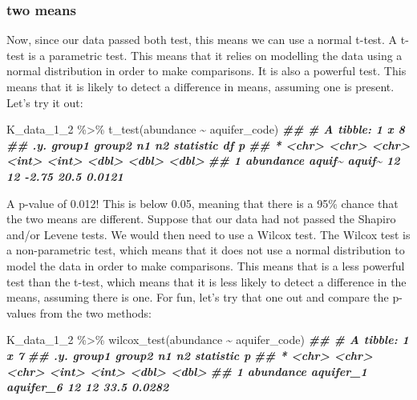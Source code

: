 \documentclass[
]{krantz}
\newenvironment{Shaded}{\begin{snugshade}}{\end{snugshade}}
\newcommand{\DocumentationTok}[1]{\textcolor[rgb]{0.56,0.35,0.01}{\textbf{\textit{#1}}}}
\newcommand{\FunctionTok}[1]{\textcolor[rgb]{0.00,0.00,0.00}{#1}}
\newcommand{\NormalTok}[1]{#1}
\newcommand{\SpecialCharTok}[1]{\textcolor[rgb]{0.00,0.00,0.00}{#1}}
\begin{document}
\hypertarget{two-means}{%
\subsubsection{two means}\label{two-means}}

Now, since our data passed both test, this means we can use a normal t-test. A t-test is a parametric test. This means that it relies on modelling the data using a normal distribution in order to make comparisons. It is also a powerful test. This means that it is likely to detect a difference in means, assuming one is present. Let's try it out:

\begin{Shaded}
\begin{Highlighting}[]
\NormalTok{K\_data\_1\_2 }\SpecialCharTok{\%\textgreater{}\%}
  \FunctionTok{t\_test}\NormalTok{(abundance }\SpecialCharTok{\textasciitilde{}}\NormalTok{ aquifer\_code)}
\DocumentationTok{\#\# \# A tibble: 1 x 8}
\DocumentationTok{\#\#   .y.       group1 group2    n1    n2 statistic    df      p}
\DocumentationTok{\#\# * \textless{}chr\textgreater{}     \textless{}chr\textgreater{}  \textless{}chr\textgreater{}  \textless{}int\textgreater{} \textless{}int\textgreater{}     \textless{}dbl\textgreater{} \textless{}dbl\textgreater{}  \textless{}dbl\textgreater{}}
\DocumentationTok{\#\# 1 abundance aquif\textasciitilde{} aquif\textasciitilde{}    12    12     {-}2.75  20.5 0.0121}
\end{Highlighting}
\end{Shaded}

A p-value of 0.012! This is below 0.05, meaning that there is a 95\% chance that the two means are different. Suppose that our data had not passed the Shapiro and/or Levene tests. We would then need to use a Wilcox test. The Wilcox test is a non-parametric test, which means that it does not use a normal distribution to model the data in order to make comparisons. This means that is a less powerful test than the t-test, which means that it is less likely to detect a difference in the means, assuming there is one. For fun, let's try that one out and compare the p-values from the two methods:

\begin{Shaded}
\begin{Highlighting}[]
\NormalTok{K\_data\_1\_2 }\SpecialCharTok{\%\textgreater{}\%}
  \FunctionTok{wilcox\_test}\NormalTok{(abundance }\SpecialCharTok{\textasciitilde{}}\NormalTok{ aquifer\_code)}
\DocumentationTok{\#\# \# A tibble: 1 x 7}
\DocumentationTok{\#\#   .y.       group1    group2       n1    n2 statistic      p}
\DocumentationTok{\#\# * \textless{}chr\textgreater{}     \textless{}chr\textgreater{}     \textless{}chr\textgreater{}     \textless{}int\textgreater{} \textless{}int\textgreater{}     \textless{}dbl\textgreater{}  \textless{}dbl\textgreater{}}
\DocumentationTok{\#\# 1 abundance aquifer\_1 aquifer\_6    12    12      33.5 0.0282}
\end{Highlighting}
\end{Shaded}
\end{document}
